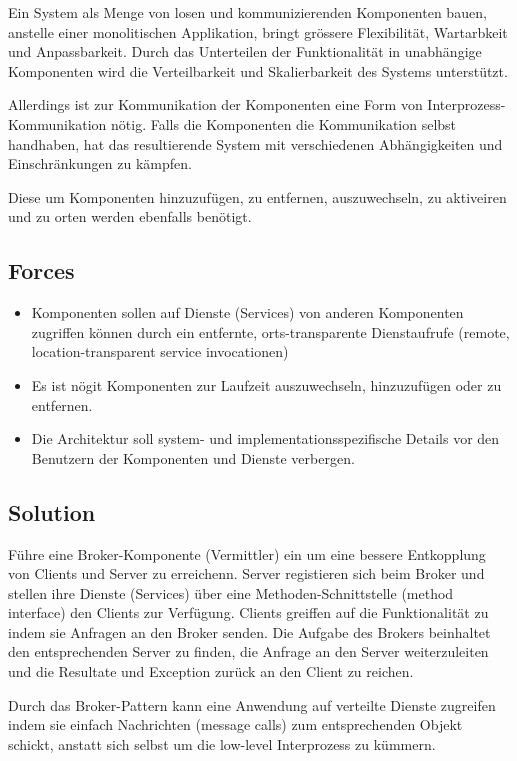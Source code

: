 Ein System als Menge von losen und kommunizierenden Komponenten bauen, anstelle einer monolitischen Applikation, bringt grössere Flexibilität, Wartarbkeit und Anpassbarkeit. Durch das Unterteilen der Funktionalität in unabhängige Komponenten wird die Verteilbarkeit und Skalierbarkeit des Systems unterstützt.

Allerdings ist zur Kommunikation der Komponenten eine Form von Interprozess-Kommunikation nötig. Falls die Komponenten die Kommunikation selbst handhaben, hat das resultierende System mit verschiedenen Abhängigkeiten und Einschränkungen zu kämpfen.

Diese um Komponenten hinzuzufügen, zu entfernen, auszuwechseln, zu aktiveiren und zu orten werden ebenfalls benötigt.

\subsection*{Forces}


\begin{itemize}
	\item Komponenten sollen auf Dienste (Services) von anderen Komponenten zugriffen können durch ein entfernte, orts-transparente Dienstaufrufe (remote, location-transparent service invocationen)
	\item Es ist nögit Komponenten zur Laufzeit auszuwechseln, hinzuzufügen oder zu entfernen.
	\item Die Architektur soll system- und implementationsspezifische Details vor den Benutzern der Komponenten und Dienste verbergen.
\end{itemize}

\subsection*{Solution}


Führe eine Broker-Komponente (Vermittler) ein um eine bessere Entkopplung von Clients und Server zu erreichenn. Server registieren sich beim Broker und stellen ihre Dienste (Services) über eine Methoden-Schnittstelle (method interface) den Clients zur Verfügung. Clients greiffen auf die Funktionalität zu indem sie Anfragen an den Broker senden. Die Aufgabe des Brokers beinhaltet den entsprechenden Server zu finden, die Anfrage an den Server weiterzuleiten und die Resultate und Exception zurück an den Client zu reichen.

Durch das Broker-Pattern kann eine Anwendung auf verteilte Dienste zugreifen indem sie einfach Nachrichten (message calls) zum entsprechenden Objekt schickt, anstatt sich selbst um die low-level Interprozess zu kümmern.


